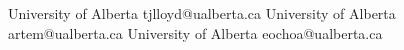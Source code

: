            {University of Alberta}
           {tjlloyd@ualberta.ca}
           {University of Alberta}
           {artem@ualberta.ca}
           {University of Alberta}
           {eochoa@ualberta.ca}
